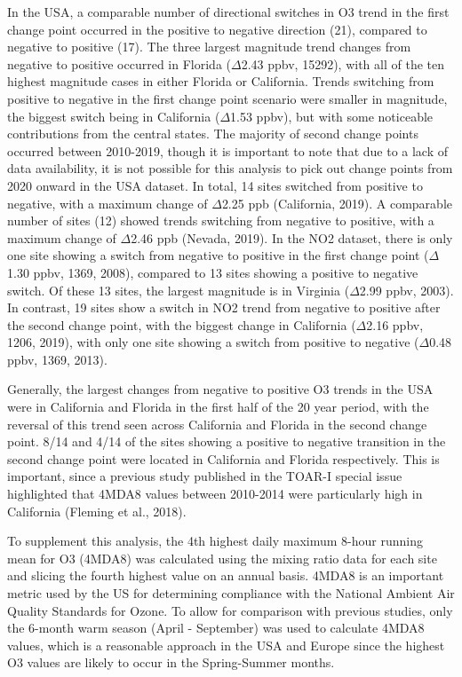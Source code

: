 \documentclass[journal abbreviation, manuscript]{copernicus}
\begin{document}
In the USA, a comparable number of directional switches in O3 trend in the first change point occurred in the positive to negative direction (21), compared to negative to positive (17). The three largest magnitude trend changes from negative to positive occurred in Florida ($\Delta$2.43 ppbv, 15292), with all of the ten highest magnitude cases in either Florida or California. Trends switching from positive to negative in the first change point scenario were smaller in magnitude, the biggest switch being in California ($\Delta$1.53 ppbv), but with some noticeable contributions from the central states. The majority of second change points occurred between 2010-2019, though it is important to note that due to a lack of data availability, it is not possible for this analysis to pick out change points from 2020 onward in the USA dataset. In total, 14 sites switched from positive to negative, with a maximum change of $\Delta$2.25 ppb (California, 2019). A comparable number of sites (12) showed trends switching from negative to positive, with a maximum change of $\Delta$2.46 ppb (Nevada, 2019). In the NO2 dataset, there is only one site showing a switch from negative to positive in the first change point ($\Delta$1.30 ppbv, 1369, 2008), compared to 13 sites showing a positive to negative switch. Of these 13 sites, the largest magnitude is in Virginia ($\Delta$2.99 ppbv, 2003). In contrast, 19 sites show a switch in NO2 trend from negative to positive after the second change point, with the biggest change in California ($\Delta$2.16 ppbv, 1206, 2019), with only one site showing a switch from positive to negative ($\Delta$0.48 ppbv, 1369, 2013).

Generally, the largest changes from negative to positive O3 trends in the USA were in California and Florida in the first half of the 20 year period, with the reversal of this trend seen across California and Florida in the second change point. 8/14 and 4/14 of the sites showing a positive to negative transition in the second change point were located in California and Florida respectively. This is important, since a previous study published in the TOAR-I special issue highlighted that 4MDA8 values between 2010-2014 were particularly high in California (Fleming et al., 2018). 

To supplement this analysis, the 4th highest daily maximum 8-hour running mean for O3 (4MDA8) was calculated using the mixing ratio data for each site and slicing the fourth highest value on an annual basis. 4MDA8 is an important metric used by the US for determining compliance with the National Ambient Air Quality Standards for Ozone. To allow for comparison with previous studies, only the 6-month warm season (April - September) was used to calculate 4MDA8 values, which is a reasonable approach in the USA and Europe since the highest O3 values are likely to occur in the Spring-Summer months.
\end{document}
